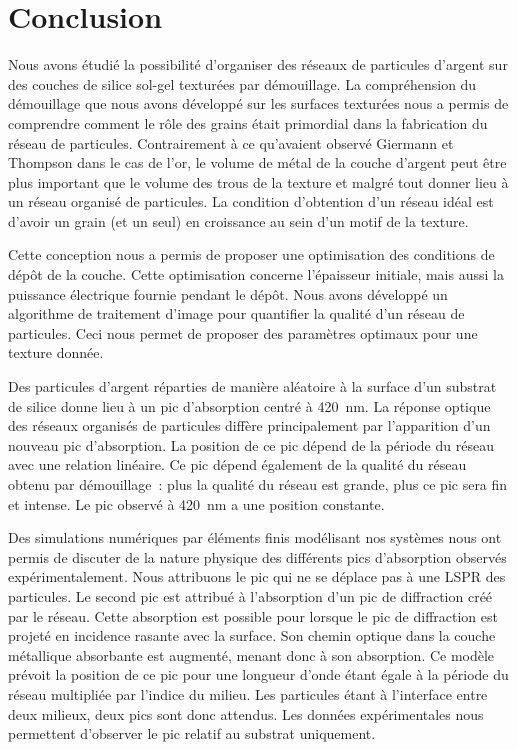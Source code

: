 \section{Conclusion}
Nous avons étudié la possibilité d'organiser des réseaux de particules d'argent sur des couches de silice sol-gel texturées par démouillage. La compréhension du démouillage que nous avons développé sur les surfaces texturées nous a permis de comprendre comment le rôle des grains était primordial dans la fabrication du réseau de particules. Contrairement à ce qu'avaient observé Giermann et Thompson dans le cas de l'or, le volume de métal de la couche d'argent peut être plus important que le volume des trous de la texture et malgré tout donner lieu à un réseau organisé de particules. La condition d'obtention d'un réseau idéal est d'avoir un grain (et un seul) en croissance au sein d'un motif de la texture. \par 
Cette conception nous a permis de proposer une optimisation des conditions de dépôt de la couche. Cette optimisation concerne l'épaisseur initiale, mais aussi la puissance électrique fournie pendant le dépôt. Nous avons développé un algorithme de traitement d'image pour quantifier la qualité d'un réseau de particules. Ceci nous permet de proposer des paramètres optimaux pour une texture donnée.\par 
Des particules d'argent réparties de manière aléatoire à la surface d'un substrat de silice donne lieu à un pic d'absorption centré à 420~nm. La réponse optique des réseaux organisés de particules diffère principalement par l'apparition d'un nouveau pic d'absorption. La position de ce pic dépend de la période du réseau avec une relation linéaire. Ce pic dépend également de la qualité du réseau obtenu par démouillage~: plus la qualité du réseau est grande, plus ce pic sera fin et intense. Le pic observé à 420~nm a une position constante.\par 
Des simulations numériques par éléments finis modélisant nos systèmes nous ont permis de discuter de la nature physique des différents pics d'absorption observés expérimentalement. Nous attribuons le pic qui ne se déplace pas à une LSPR des particules. Le second pic est attribué à l'absorption d'un pic de diffraction créé par le réseau. Cette absorption est possible pour lorsque le pic de diffraction est projeté en incidence rasante avec la surface. Son chemin optique dans la couche métallique absorbante est augmenté, menant donc à son absorption. Ce modèle prévoit la position de ce pic pour une longueur d'onde étant égale à la période du réseau multipliée par l'indice du milieu. Les particules étant à l'interface entre deux milieux, deux pics sont donc attendus. Les données expérimentales nous permettent d'observer le pic relatif au substrat uniquement.\par 

